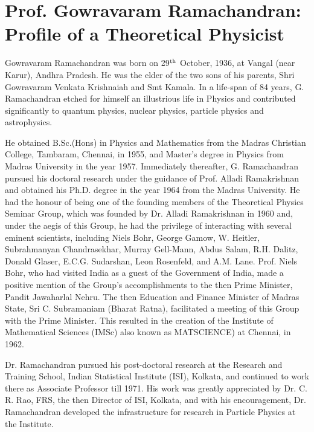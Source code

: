 \chapter{Prof. Gowravaram Ramachandran: Profile of a Theoretical Physicist}


Gowravaram Ramachandran was born on 29$^{\rm th}$ October, 1936, at Vangal (near Karur), Andhra Pradesh. He was the elder of the two sons of his parents, Shri Gowravaram Venkata Krishnaiah and Smt Kamala. In a life-span of 84 years, G. Ramachandran etched for himself an illustrious life in Physics and contributed significantly to quantum physics, nuclear physics, particle physics and astrophysics.
 
He obtained B.Sc.(Hons) in Physics and Mathematics from the Madras Christian College, Tambaram, Chennai, in 1955, and Master's degree in Physics from Madras University in the year 1957. Immediately thereafter, G. Ramachandran pursued his doctoral research under the guidance of Prof. Alladi Ramakrishnan and obtained his Ph.D. degree in the year 1964 from the Madras University. He had the honour of being one of the founding members of the Theoretical Physics Seminar Group, which was founded by Dr. Alladi Ramakrishnan in 1960 and, under the aegis of this Group, he had the privilege of interacting with several eminent scientists, including Niels Bohr, George Gamow, W. Heitler,  Subrahmanyan Chandrasekhar, Murray Gell-Mann, Abdus Salam, R.H. Dalitz, Donald Glaser, E.C.G. Sudarshan, Leon Rosenfeld, and A.M. Lane. Prof. Niels Bohr, who had visited India as a guest of the Government of India, made a positive mention of the Group's accomplishments to the then Prime Minister, Pandit Jawaharlal Nehru. The then Education and Finance Minister of Madras State, Sri C. Subramaniam (Bharat Ratna), facilitated a meeting of this Group with the Prime Minister. This resulted in the creation of the Institute of Mathematical Sciences (IMSc) also known as MATSCIENCE) at Chennai, in 1962.
 
 Dr. Ramachandran pursued his post-doctoral research at the Research and Training School, Indian Statistical Institute (ISI), Kolkata, and continued to work there as Associate Professor till 1971. His work was greatly appreciated by Dr. C. R. Rao, FRS, the then Director of ISI, Kolkata, and with his encouragement, Dr. Ramachandran developed the infrastructure for research in Particle Physics at the Institute.
 
